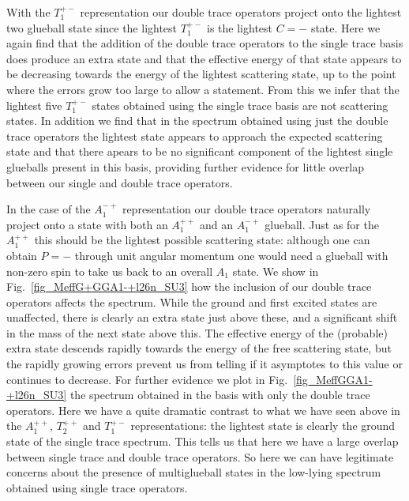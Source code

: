 \documentclass[12pt]{article}
\begin{document}
With the $T_1^{+-}$ representation our double trace operators project onto the
lightest two glueball state since the lightest  $T_1^{+-}$ is the lightest $C=-$ state.
Here we again find 
that the addition of the double trace operators to the single trace basis does
produce an extra state and that the effective energy of that state appears
to be decreasing towards the energy of the lightest scattering state, up to the
point where the errors grow too large to allow a statement. From this
we infer
that the lightest five $T_1^{+-}$ states obtained using the single trace basis are
not scattering states. In addition we find that in the
spectrum obtained using just the double trace operators the
lightest state appears to approach the expected scattering state and that
there apears to be no significant component of the lightest single glueballs
present in this basis, providing further evidence for little overlap
between our single and double trace operators.

In the case of the  $A_1^{-+}$ representation our double trace operators naturally
project onto a state with both an $A_1^{++}$ and an $A_1^{-+}$ glueball. Just as
for the $A_1^{++}$ this should be the lightest possible scattering state: although
one can obtain $P=-$ through unit angular momentum one would need a glueball
with non-zero spin to take us back to an overall $A_1$ state.
We show in Fig.~\ref{fig_MeffG+GGA1-+l26n_SU3}
how the inclusion of our double trace operators affects the spectrum. While the
ground and first excited states are unaffected, there is clearly an extra state
just above these, and a significant shift in the mass of the next state above this.
The effective energy of the (probable) extra state descends rapidly towards
the energy of the free scattering state, but the rapidly growing errors prevent
us from telling if it asymptotes to this value or continues to decrease.
For further evidence we plot in Fig.~\ref{fig_MeffGGA1-+l26n_SU3} the spectrum
obtained in the basis with only the double trace operators. Here we have a quite
dramatic contrast to what we have seen above in the $A_1^{++}$, $T_2^{++}$
and $T_1^{+-}$ representations: the lightest state is clearly the ground state
of the single trace spectrum. This tells us that here we have a large overlap
between single trace and double trace operators. So here we can have legitimate concerns
about the presence of multiglueball states in the low-lying spectrum obtained
using single trace operators.
\end{document}
